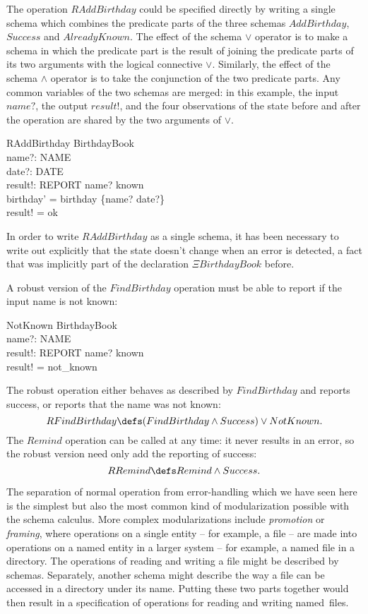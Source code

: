 \documentclass{llncs}
\begin{document}
The operation $RAddBirthday$ could be specified directly by writing
a single schema which combines the predicate parts of the three
schemas $AddBirthday$, $Success$ and $AlreadyKnown$.
The effect of the schema $\lor$ operator is to make a schema
in which the predicate part is the result of joining the predicate parts of
its two arguments with the logical connective $\lor$. Similarly, the effect
of the schema $\land$ operator is to take the conjunction of the two
predicate parts.
Any common variables of the two schemas are merged: in this example, the
input $name?$, the output $result!$, and the four observations of the
state before and after the operation are shared by the two arguments of
$\lor$.
\begin{schema}{RAddBirthday}
	\Delta BirthdayBook \\
	name?: NAME \\
	date?: DATE \\
	result!: REPORT
\where
name? \notin known\\
birthday' = birthday \cup \{name? \mapsto date?\}\\
result! = ok\\
\end{schema}
In order to write $RAddBirthday$ as a single schema, it has been
necessary to write out explicitly that the state doesn't change when
an error is detected, a fact that was implicitly
part of the declaration $\Xi BirthdayBook$ before.

A robust version of the $FindBirthday$ operation must be able to report
if the input name is not known:
\begin{schema}{NotKnown}
	\Xi BirthdayBook \\
	name?: NAME \\
	result!: REPORT
\where
	name? \notin known \\
	result! = not\_known
\end{schema}
The robust operation either behaves as described by $FindBirthday$ and
reports success, or reports that the name was not known:
\[ RFindBirthday \defs (FindBirthday \land Success) \lor NotKnown. \]
The $Remind$ operation can be called at any time: it never results in
an error, so the robust version need only add the reporting of success:
\[ RRemind \defs Remind \land Success. \]

The separation of normal operation from error-handling which we
have seen here is the simplest but also the most common kind of
modularization possible with the schema calculus.
More complex modularizations include {\em promotion} or
{\em framing}, where operations
on a single entity -- for example, a file -- are made into
operations on a named entity in a larger system -- for example, a
named file in a directory.
The operations of reading and writing a file might be described by
schemas. Separately, another schema might describe the way a file can
be accessed in a directory under its name. Putting these two parts
together would then result in a specification of operations for
reading and writing named~files.
\end{document}
